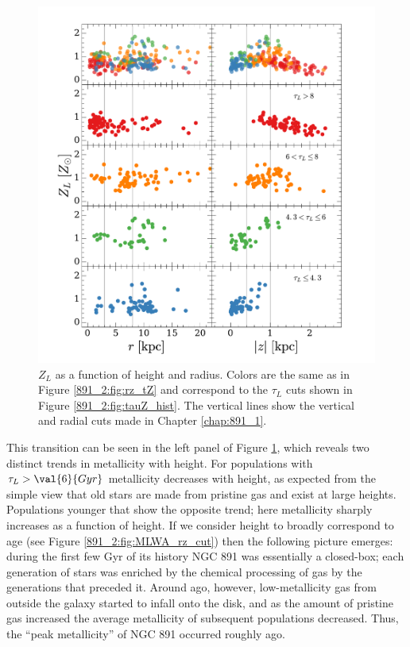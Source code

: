 \begin{figure}
  \centering
  \includegraphics[width=\textwidth]{891_2/figs/MLWZ_rz_cut.pdf}
  \caption[$Z_L$ as function of
    ($r,|z|$)]{\fixspacing\label{891_2:fig:MLWZ_rz_cut}$Z_L$ as a
    function of height and radius. Colors are the same as in Figure
    \ref{891_2:fig:rz_tZ} and correspond to the $\tau_L$ cuts shown in
    Figure \ref{891_2:fig:tauZ_hist}. The vertical lines show the
    vertical and radial cuts made in Chapter \ref{chap:891_1}.}
\end{figure}

This transition can be seen in the left panel of Figure
\ref{891_2:fig:MLWZ_rz_cut}, which reveals two distinct trends in
metallicity with height. For populations with $\tau_L > \val{6}{Gyr}$
metallicity decreases with height, as expected from the simple view
that old stars are made from pristine gas and exist at large
heights. Populations younger that  show the opposite
trend; here metallicity sharply increases as a function of height. If
we consider height to broadly correspond to age (see Figure
\ref{891_2:fig:MLWA_rz_cut}) then the following picture emerges:
during the first few Gyr of its history NGC 891 was essentially a
closed-box; each generation of stars was enriched by the chemical
processing of gas by the generations that preceded it. Around
 ago, however, low-metallicity gas from outside the galaxy
started to infall onto the disk, and as the amount of pristine gas
increased the average metallicity of subsequent populations
decreased. Thus, the ``peak metallicity'' of NGC 891 occurred roughly
 ago. 

